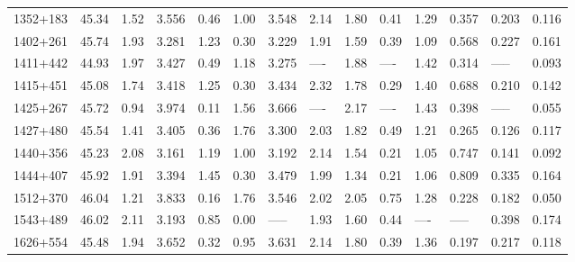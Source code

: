 \begin{tabular}{lrlrrrllrllllr}
 1352+183 &      45.34 &  1.52 &           3.556 &          0.46 &          1.00 &         3.548 &         2.14 &       1.80 &        0.41 &        1.29 &        0.357 &      0.203 &          0.116 \\
 1402+261 &      45.74 &  1.93 &           3.281 &          1.23 &          0.30 &         3.229 &         1.91 &       1.59 &        0.39 &        1.09 &        0.568 &      0.227 &          0.161 \\
 1411+442 &      44.93 &  1.97 &           3.427 &          0.49 &          1.18 &         3.275 &         ---- &       1.88 &        ---- &        1.42 &        0.314 &      ----- &          0.093 \\
 1415+451 &      45.08 &  1.74 &           3.418 &          1.25 &          0.30 &         3.434 &         2.32 &       1.78 &        0.29 &        1.40 &        0.688 &      0.210 &          0.142 \\
 1425+267 &      45.72 &  0.94 &           3.974 &          0.11 &          1.56 &         3.666 &         ---- &       2.17 &        ---- &        1.43 &        0.398 &      ----- &          0.055 \\
 1427+480 &      45.54 &  1.41 &           3.405 &          0.36 &          1.76 &         3.300 &         2.03 &       1.82 &        0.49 &        1.21 &        0.265 &      0.126 &          0.117 \\
 1440+356 &      45.23 &  2.08 &           3.161 &          1.19 &          1.00 &         3.192 &         2.14 &       1.54 &        0.21 &        1.05 &        0.747 &      0.141 &          0.092 \\
 1444+407 &      45.92 &  1.91 &           3.394 &          1.45 &          0.30 &         3.479 &         1.99 &       1.34 &        0.21 &        1.06 &        0.809 &      0.335 &          0.164 \\
 1512+370 &      46.04 &  1.21 &           3.833 &          0.16 &          1.76 &         3.546 &         2.02 &       2.05 &        0.75 &        1.28 &        0.228 &      0.182 &          0.050 \\
 1543+489 &      46.02 &  2.11 &           3.193 &          0.85 &          0.00 &         ----- &         1.93 &       1.60 &        0.44 &        ---- &        ----- &      0.398 &          0.174 \\
 1626+554 &      45.48 &  1.94 &           3.652 &          0.32 &          0.95 &         3.631 &         2.14 &       1.80 &        0.39 &        1.36 &        0.197 &      0.217 &          0.118 \\
\bottomrule
\end{tabular}
